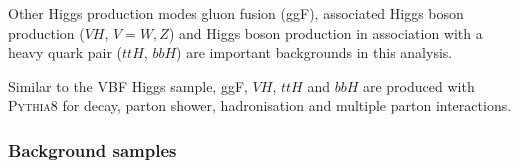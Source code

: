 Other Higgs production modes gluon fusion (ggF), associated Higgs boson production ($VH$, $V=W,Z$) and Higgs boson production in association with a heavy quark pair ($ttH$, $bbH$) are important backgrounds in this analysis.%

Similar to the VBF Higgs sample, ggF, $VH$, $ttH$ and $bbH$ are produced with \textsc{Pythia8}\cite{pythia,Sjostrand:2007gs} for decay, parton shower, hadronisation and multiple parton interactions.

 
\subsubsection{Background samples}
\label{sec:bkgMC}

